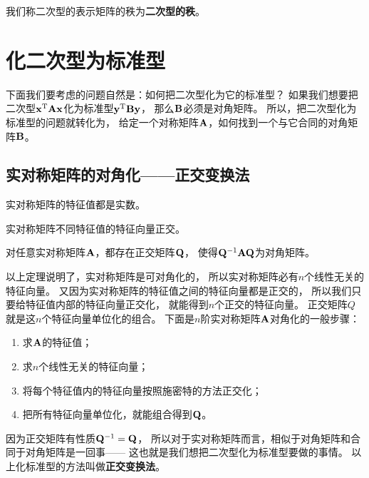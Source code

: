 \begin{definition}[二次型的秩]
  我们称二次型的表示矩阵的秩为\textbf{二次型的秩}。
\end{definition}

\section{化二次型为标准型}
下面我们要考虑的问题自然是：如何把二次型化为它的标准型？
如果我们想要把二次型$\mathbf{x}^{\textrm{T}}\mathbf{A}\mathbf{x}$化为标准型$\mathbf{y}^{\textrm{T}}\mathbf{B}\mathbf{y}$，
那么$\mathbf{B}$必须是对角矩阵。
所以，把二次型化为标准型的问题就转化为，
给定一个对称矩阵$\mathbf{A}$，如何找到一个与它合同的对角矩阵$\mathbf{B}$。

\subsection{实对称矩阵的对角化——正交变换法}
\begin{theorem}
  实对称矩阵的特征值都是实数。
\end{theorem}

\begin{theorem}
  实对称矩阵不同特征值的特征向量正交。
\end{theorem}

\begin{theorem}[实对称矩阵的可对角化]
  对任意实对称矩阵$\mathbf{A}$，都存在正交矩阵$\mathbf{Q}$，
  使得$\mathbf{Q}^{-1}\mathbf{A}\mathbf{Q}$为对角矩阵。
\end{theorem}

以上定理说明了，实对称矩阵是可对角化的，
所以实对称矩阵必有$n$个线性无关的特征向量。
又因为实对称矩阵的特征值之间的特征向量都是正交的，
所以我们只要给特征值内部的特征向量正交化，
就能得到$n$个正交的特征向量。
正交矩阵$Q$就是这$n$个特征向量单位化的组合。
下面是$n$阶实对称矩阵$\mathbf{A}$对角化的一般步骤：
\begin{enumerate}
  \item
  求$\mathbf{A}$的特征值；
  \item
  求$n$个线性无关的特征向量；
  \item 
  将每个特征值内的特征向量按照施密特的方法正交化；
  \item
  把所有特征向量单位化，就能组合得到$\mathbf{Q}$。
\end{enumerate}

\begin{remark}
  因为正交矩阵有性质$\mathbf{Q}^{-1}=\mathbf{Q}$，
  所以对于实对称矩阵而言，相似于对角矩阵和合同于对角矩阵是一回事——
  这也就是我们想把二次型化为标准型要做的事情。
  以上化标准型的方法叫做\textbf{正交变换法}。
\end{remark}

